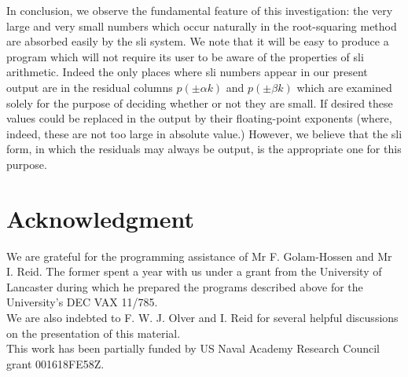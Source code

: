 \documentclass[10pt]{article}
\begin{document}
In conclusion, we observe the fundamental feature of this investigation: the very large and very small numbers which occur naturally in the root-squaring method are absorbed easily by the sli system. We note that it will be easy to produce a\\
program which will not require its user to be aware of the properties of sli arithmetic. Indeed the only places where sli numbers appear in our present output are in the residual columns $p( \pm \alpha k)$ and $p( \pm \beta k)$ which are examined solely for the purpose of deciding whether or not they are small. If desired these values could be replaced in the output by their floating-point exponents (where, indeed, these are not too large in absolute value.) However, we believe that the sli form, in which the residuals may always be output, is the appropriate one for this purpose.

\section*{Acknowledgment}
We are grateful for the programming assistance of Mr F. Golam-Hossen and Mr I. Reid. The former spent a year with us under a grant from the University of Lancaster during which he prepared the programs described above for the University's DEC VAX 11/785.\\
We are also indebted to F. W. J. Olver and I. Reid for several helpful discussions on the presentation of this material.\\
This work has been partially funded by US Naval Academy Research Council grant 001618FE58Z.
\end{document}
